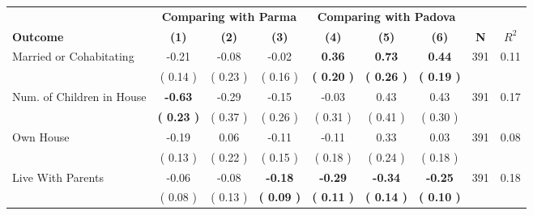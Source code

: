 \begin{tabular}{lcccccccc}
\toprule
 & \multicolumn{3}{c}{\textbf{Comparing with Parma}} & \multicolumn{3}{c}{\textbf{Comparing with Padova}} & \\
\cmidrule(lr){2-4} \cmidrule(lr){5-7} 
 \textbf{Outcome} & \textbf{(1)} & \textbf{(2)} & \textbf{(3)} & \textbf{(4)} & \textbf{(5)} & \textbf{(6)} & \textbf{N} & \textbf{$ R^2$} \\
\midrule
Married or Cohabitating &     -0.21 &     -0.08 &     -0.02 & \textbf{     0.36} & \textbf{     0.73} & \textbf{     0.44} & 391 &       0.11 \\ 
 & (     0.14 ) & (     0.23 ) & (     0.16 ) & \textbf{(     0.20 )} & \textbf{(     0.26 )} & \textbf{(     0.19 )} & \\
Num. of Children in House & \textbf{    -0.63} &     -0.29 &     -0.15 &     -0.03 &      0.43 &      0.43 & 391 &       0.17 \\ 
 & \textbf{(     0.23 )} & (     0.37 ) & (     0.26 ) & (     0.31 ) & (     0.41 ) & (     0.30 ) & \\
Own House &     -0.19 &      0.06 &     -0.11 &     -0.11 &      0.33 &      0.03 & 391 &       0.08 \\ 
 & (     0.13 ) & (     0.22 ) & (     0.15 ) & (     0.18 ) & (     0.24 ) & (     0.18 ) & \\
Live With Parents &     -0.06 &     -0.08 & \textbf{    -0.18} & \textbf{    -0.29} & \textbf{    -0.34} & \textbf{    -0.25} & 391 &       0.18 \\ 
 & (     0.08 ) & (     0.13 ) & \textbf{(     0.09 )} & \textbf{(     0.11 )} & \textbf{(     0.14 )} & \textbf{(     0.10 )} & \\
\bottomrule
\end{tabular}
